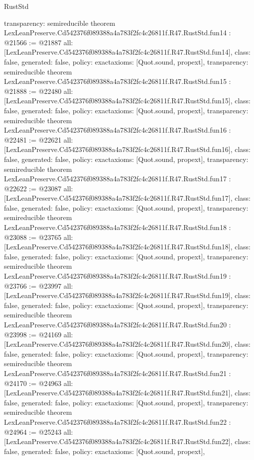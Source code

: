\begin{lexlean}{RustStd}
\begin{coremodule}
{  transparency: semireducible
}
theorem LexLeanPreserve.Cd542376f089388a4a783f2fc4c26811f.R47.RustStd.fun14 : @21566 := @21887 {
  all: [LexLeanPreserve.Cd542376f089388a4a783f2fc4c26811f.R47.RustStd.fun14],
  class: false,
  generated: false,
  policy: exact{axioms: [Quot.sound, propext]},
  transparency: semireducible
}
theorem LexLeanPreserve.Cd542376f089388a4a783f2fc4c26811f.R47.RustStd.fun15 : @21888 := @22480 {
  all: [LexLeanPreserve.Cd542376f089388a4a783f2fc4c26811f.R47.RustStd.fun15],
  class: false,
  generated: false,
  policy: exact{axioms: [Quot.sound, propext]},
  transparency: semireducible
}
theorem LexLeanPreserve.Cd542376f089388a4a783f2fc4c26811f.R47.RustStd.fun16 : @22481 := @22621 {
  all: [LexLeanPreserve.Cd542376f089388a4a783f2fc4c26811f.R47.RustStd.fun16],
  class: false,
  generated: false,
  policy: exact{axioms: [Quot.sound, propext]},
  transparency: semireducible
}
theorem LexLeanPreserve.Cd542376f089388a4a783f2fc4c26811f.R47.RustStd.fun17 : @22622 := @23087 {
  all: [LexLeanPreserve.Cd542376f089388a4a783f2fc4c26811f.R47.RustStd.fun17],
  class: false,
  generated: false,
  policy: exact{axioms: [Quot.sound, propext]},
  transparency: semireducible
}
theorem LexLeanPreserve.Cd542376f089388a4a783f2fc4c26811f.R47.RustStd.fun18 : @23088 := @23765 {
  all: [LexLeanPreserve.Cd542376f089388a4a783f2fc4c26811f.R47.RustStd.fun18],
  class: false,
  generated: false,
  policy: exact{axioms: [Quot.sound, propext]},
  transparency: semireducible
}
theorem LexLeanPreserve.Cd542376f089388a4a783f2fc4c26811f.R47.RustStd.fun19 : @23766 := @23997 {
  all: [LexLeanPreserve.Cd542376f089388a4a783f2fc4c26811f.R47.RustStd.fun19],
  class: false,
  generated: false,
  policy: exact{axioms: [Quot.sound, propext]},
  transparency: semireducible
}
theorem LexLeanPreserve.Cd542376f089388a4a783f2fc4c26811f.R47.RustStd.fun20 : @23998 := @24169 {
  all: [LexLeanPreserve.Cd542376f089388a4a783f2fc4c26811f.R47.RustStd.fun20],
  class: false,
  generated: false,
  policy: exact{axioms: [Quot.sound, propext]},
  transparency: semireducible
}
theorem LexLeanPreserve.Cd542376f089388a4a783f2fc4c26811f.R47.RustStd.fun21 : @24170 := @24963 {
  all: [LexLeanPreserve.Cd542376f089388a4a783f2fc4c26811f.R47.RustStd.fun21],
  class: false,
  generated: false,
  policy: exact{axioms: [Quot.sound, propext]},
  transparency: semireducible
}
theorem LexLeanPreserve.Cd542376f089388a4a783f2fc4c26811f.R47.RustStd.fun22 : @24964 := @25243 {
  all: [LexLeanPreserve.Cd542376f089388a4a783f2fc4c26811f.R47.RustStd.fun22],
  class: false,
  generated: false,
  policy: exact{axioms: [Quot.sound, propext]},
}
\end{coremodule}
\end{lexlean}
